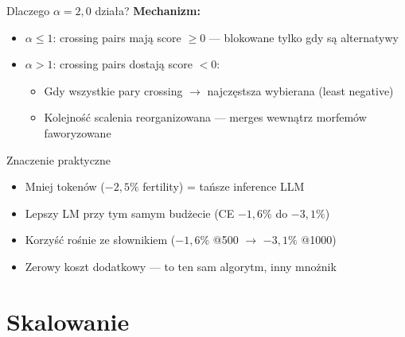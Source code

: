 \documentclass[aspectratio=169,11pt]{beamer}
\begin{document}
\begin{frame}{Dlaczego $\alpha = 2{,}0$ działa?}
\textbf{Mechanizm:}

\begin{itemize}
  \item $\alpha \le 1$: crossing pairs mają score $\ge 0$ --- blokowane tylko gdy są alternatywy
  \item $\alpha > 1$: crossing pairs dostają score $< 0$:
  \begin{itemize}
    \item Gdy wszystkie pary crossing $\to$ najczęstsza wybierana (least negative)
    \item Kolejność scalenia reorganizowana --- merges wewnątrz morfemów faworyzowane
  \end{itemize}
\end{itemize}

\bigskip

\begin{block}{Znaczenie praktyczne}
\begin{itemize}
  \item Mniej tokenów ($-2{,}5\%$ fertility) = tańsze inference LLM
  \item Lepszy LM przy tym samym budżecie (CE $-1{,}6\%$ do $-3{,}1\%$)
  \item Korzyść rośnie ze słownikiem ($-1{,}6\%$ @500 $\to$ $-3{,}1\%$ @1000)
  \item Zerowy koszt dodatkowy --- to ten sam algorytm, inny mnożnik
\end{itemize}
\end{block}
\end{frame}

\section{Skalowanie}
\end{document}
